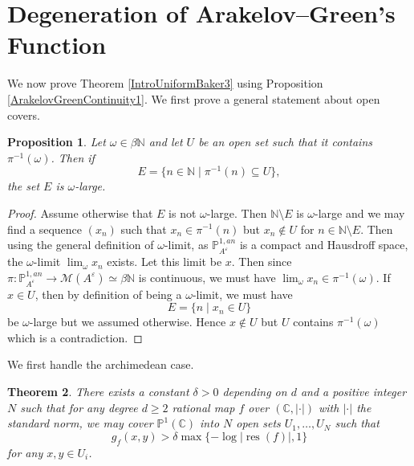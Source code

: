 \documentclass[10pt]{amsart}
\newcommand{\bb}{\mathbb}
\newcommand{\res}{\operatorname{res}}
\newcommand{\berkP}{\mathbb{P}^{1,an}}
\newcommand{\cal}{\mathcal}
\newcommand{\eps}{\varepsilon}
\newtheorem{theorem}{Theorem}
\numberwithin{theorem}{section}
\newtheorem{proposition}[theorem]{Proposition}
\numberwithin{example}{section}
\numberwithin{definition}{section}
\begin{document}
\section{Degeneration of Arakelov--Green's Function} We now prove Theorem \ref{IntroUniformBaker3} using Proposition \ref{ArakelovGreenContinuity1}. We first prove a general statement about open covers. 

\begin{proposition} \label{OpenCover1}
Let $\omega \in \beta \bb{N}$ and let $U$ be an open set such that it contains $\pi^{-1}(\omega)$. Then if 
$$E = \{ n \in \bb{N} \mid \pi^{-1}(n) \subseteq U\},$$
the set $E$ is $\omega$-large. 
\end{proposition}

\begin{proof}
Assume otherwise that $E$ is not $\omega$-large. Then $\bb{N} \setminus E$ is $\omega$-large and we may find a sequence $(x_n)$ such that $x_n \in \pi^{-1}(n)$ but $x_n \not \in U$ for $n \in \bb{N} \setminus E$. Then using the general definition of $\omega$-limit, as $\berkP_{A^{\eps}}$ is a compact and Hausdroff space, the $\omega$-limit $\lim_{\omega} x_n$ exists. Let this limit be $x$. Then since $\pi: \berkP_{A^{\eps}} \to \cal{M}(A^{\eps}) \simeq \beta \bb{N}$ is continuous, we must have $\lim_{\omega} x_n \in \pi^{-1}(\omega)$. If $x \in U$, then by definition of being a $\omega$-limit, we must have 
$$E = \{n \mid x_n \in U\}$$
be $\omega$-large but we assumed otherwise. Hence $x \not \in U$ but $U$ contains $\pi^{-1}(\omega)$ which is a contradiction. 
\end{proof}

We first handle the archimedean case. 

\begin{theorem} \label{UniformBakerLower1}
There exists a constant $\delta > 0$ depending on $d$ and a positive integer $N$ such that for any degree $d \geq 2$ rational map $f$ over $(\bb{C}, | \cdot |)$ with $| \cdot |$ the standard norm, we may cover $\bb{P}^1(\bb{C})$ into $N$ open sets $U_1,\ldots,U_N$ such that 
$$g_{f}(x,y) > \delta \max\{-\log |\res(f)|,1\}$$ 
for any $x,y \in U_i$.  
\end{theorem}
\end{document}
